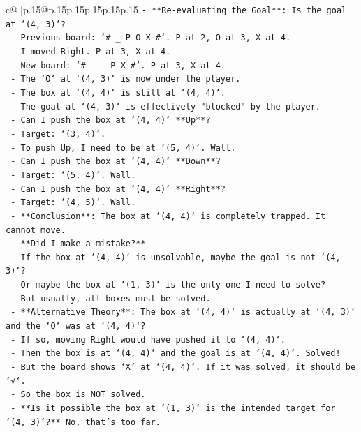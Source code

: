 \documentclass{article}
\begin{document}
{\begin{supertabular}{c@{$\;$}|p{.15\linewidth}@{}p{.15\linewidth}p{.15\linewidth}p{.15\linewidth}p{.15\linewidth}p{.15\linewidth}}
{{{\texttt{{-} **Re{-}evaluating the Goal**: Is the goal at `(4, 3)`?} \\
\texttt{  {-} Previous board: `\# \_ P O X \#`. P at 2, O at 3, X at 4.} \\
\texttt{  {-} I moved Right. P at 3, X at 4.} \\
\texttt{  {-} New board: `\# \_ \_ P X \#`. P at 3, X at 4.} \\
\texttt{  {-} The `O` at `(4, 3)` is now under the player.} \\
\texttt{  {-} The box at `(4, 4)` is still at `(4, 4)`.} \\
\texttt{  {-} The goal at `(4, 3)` is effectively "blocked" by the player.} \\
\texttt{  {-} Can I push the box at `(4, 4)` **Up**?} \\
\texttt{    {-} Target: `(3, 4)`.} \\
\texttt{    {-} To push Up, I need to be at `(5, 4)`. Wall.} \\
\texttt{  {-} Can I push the box at `(4, 4)` **Down**?} \\
\texttt{    {-} Target: `(5, 4)`. Wall.} \\
\texttt{  {-} Can I push the box at `(4, 4)` **Right**?} \\
\texttt{    {-} Target: `(4, 5)`. Wall.} \\
\texttt{  {-} **Conclusion**: The box at `(4, 4)` is completely trapped. It cannot move.} \\
\texttt{  {-} **Did I make a mistake?**} \\
\texttt{    {-} If the box at `(4, 4)` is unsolvable, maybe the goal is not `(4, 3)`?} \\
\texttt{    {-} Or maybe the box at `(1, 3)` is the only one I need to solve?} \\
\texttt{    {-} But usually, all boxes must be solved.} \\
\texttt{    {-} **Alternative Theory**: The box at `(4, 4)` is actually at `(4, 3)` and the `O` was at `(4, 4)`?} \\
\texttt{      {-} If so, moving Right would have pushed it to `(4, 4)`.} \\
\texttt{      {-} Then the box is at `(4, 4)` and the goal is at `(4, 4)`. Solved!} \\
\texttt{      {-} But the board shows `X` at `(4, 4)`. If it was solved, it should be `√`.} \\
\texttt{      {-} So the box is NOT solved.} \\
\texttt{    {-} **Is it possible the box at `(1, 3)` is the intended target for `(4, 3)`?** No, that's too far.} \\
}}}
\end{supertabular}}
\end{document}
